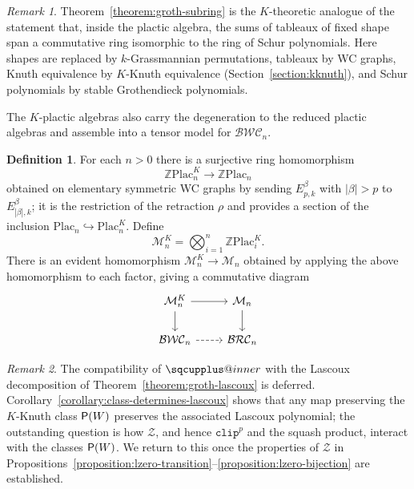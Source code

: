 \documentclass{amsart}
\makeatletter
\newcommand{\sqcupplus@inner}[2]{%
  \vcenter{\hbox{\ooalign{%
    \hfil$\m@th#1\sqcup$\hfil\cr
    \hfil\raisebox{0.15ex}{$\m@th#1\scriptscriptstyle+$}\hfil\cr
  }}}%
}
\newcommand{\sqcupplus}{\mathbin{\mathpalette\sqcupplus@inner\relax}}
\theoremstyle{definition}
\newtheorem{definition}[lemma]{Definition}
\theoremstyle{remark}
\newtheorem*{remark}{Remark}
\numberwithin{equation}{subsection}
\newcommand{\plac}{\mathrm{Plac}}
\newcommand{\kplac}{\mathrm{Plac}^K}
\newcommand{\clp}{\mathtt{clip}}
\newcommand{\BRC}{\mathcal{BRC}}
\newcommand{\BWC}{\mathcal{BWC}}
\newcommand{\lzeromap}{\mathscr{Z}}
\makeatother
\begin{document}
\begin{remark}
Theorem~\ref{theorem:groth-subring} is the $K$-theoretic analogue of the
statement that, inside the plactic algebra, the sums of tableaux of fixed shape
span a commutative ring isomorphic to the ring of Schur polynomials. Here shapes
are replaced by $k$-Grassmannian permutations, tableaux by WC graphs,
Knuth equivalence by $K$-Knuth equivalence (Section~\ref{section:kknuth}), and
Schur polynomials by stable Grothendieck polynomials.
\end{remark}

The $K$-plactic algebras also carry the degeneration to the reduced plactic
algebras and assemble into a tensor model for $\BWC_n$.

\begin{definition}
For each $n>0$ there is a surjective ring homomorphism
$$\mathbb{Z}\kplac_n\to \mathbb{Z}\plac_n$$
obtained on elementary symmetric WC graphs by sending $E_{p,k}^{\beta}$ with
$|\beta|>p$ to $E_{|\beta|,k}^{\beta}$; it is the restriction of the retraction
$\rho$ and provides a section of the inclusion $\plac_n\hookrightarrow\kplac_n$.
Define
$$\mathcal{M}_n^K = \bigotimes_{i=1}^n \mathbb{Z}\kplac_i.$$
There is an evident homomorphism $\mathcal{M}_n^K\to \mathcal{M}_n$ obtained by
applying the above homomorphism to each factor, giving a commutative diagram
$$\begin{tikzcd}
\mathcal{M}_n^K \arrow[r]\arrow[d]  & \mathcal{M}_n\arrow[d]  \\
\BWC_n \arrow[r, dashed] & \BRC_n
\end{tikzcd}$$
\end{definition}

\begin{remark}
The compatibility of $\sqcupplus$ with the Lascoux decomposition of
Theorem~\ref{theorem:groth-lascoux} is deferred. Corollary~\ref{corollary:class-determines-lascoux}
shows that any map preserving the $K$-Knuth class $\mathsf{P}(W)$ preserves the
associated Lascoux polynomial; the outstanding question is how $\lzeromap$, and
hence $\clp^p$ and the squash product, interact with the classes $\mathsf{P}(W)$. We
return to this once the properties of $\lzeromap$ in
Propositions~\ref{proposition:lzero-transition}--\ref{proposition:lzero-bijection}
are established.
\end{remark}
\end{document}
